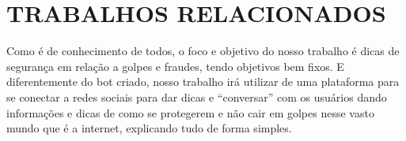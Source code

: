 \chapter{\uppercase{Trabalhos Relacionados}}
\label{TrabalhosRelacionados}

Como é de conhecimento de todos, o foco e objetivo do nosso trabalho é dicas de segurança em relação a golpes e fraudes, tendo objetivos bem fixos. E diferentemente do bot criado, nosso trabalho irá utilizar de uma plataforma para se conectar a redes sociais para dar dicas e “conversar” com os usuários dando informações e dicas de como se protegerem e não cair em golpes nesse vasto mundo que é a internet, explicando tudo de forma simples.